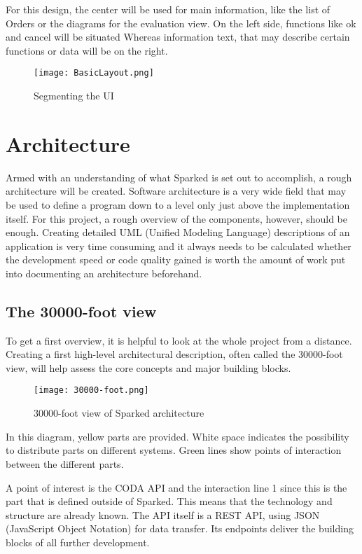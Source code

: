 For this design, the center will be used for main information, like the list of Orders or the diagrams for the evaluation view. On the left side, functions like ok and cancel will be situated Whereas information text, that may describe certain functions or data will be on the right. 


\begin{figure}
	\texttt{[image: BasicLayout.png]}
	\caption{Segmenting the UI}
\end{figure} 

\section{Architecture}
Armed with an understanding of what Sparked is set out to accomplish, a rough architecture will be created. Software architecture is a very wide field that may be used to define a program down to a level only just above the implementation itself. For this project, a rough overview of the components, however, should be enough. Creating detailed UML (Unified Modeling Language) descriptions of an application is very time consuming and it always needs to be calculated whether the development speed or code quality gained is worth the amount of work put into documenting an architecture beforehand. 

\subsection{The 30000-foot view}
To get a first overview, it is helpful to look at the whole project from a distance. Creating a first high-level architectural description, often called the 30000-foot view, will help assess the core concepts and major building blocks.
 
\begin{figure}
	\texttt{[image: 30000-foot.png]}
	\caption{30000-foot view of Sparked architecture }
\end{figure}

In this diagram, yellow parts are provided. White space indicates the possibility to distribute parts on different systems. Green lines show points of interaction between the different parts.

A point of interest is the CODA API and the interaction line 1 since this is the part that is defined outside of Sparked. This means that the technology and structure are already known. The API itself is a REST API, using JSON (JavaScript Object Notation) for data transfer. Its endpoints deliver the building blocks of all further development. 

